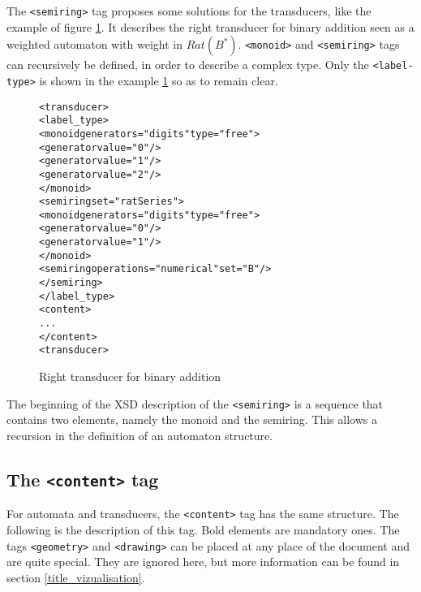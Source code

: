 \documentclass[a4paper]{article}
\def\typetag{\texttt{<label-type>}}
\def\contenttag{\texttt{<content>}}
\def\dstname{\texttt{dst}}
\def\srcname{\texttt{src}}
\def\geometrytag{\texttt{<geometry>}}
\def\drawingtag{\texttt{<drawing>}}
\def\monoidtag{\texttt{<monoid>}}
\def\semiringtag{\texttt{<semiring>}}
\begin{document}
The \semiringtag{} tag proposes some solutions for the transducers, like the
example of figure \ref{ratseries1}. It describes the right transducer
for binary addition seen as a weighted automaton with
weight in $Rat(B^*)$. \monoidtag{} and \semiringtag{} tags can recursively be
defined, in order to describe a complex type. Only the \typetag{} is shown in
the example \ref{ratseries1} so as to remain clear.

\begin{figure}[h]
  \begin{center}
\begin{alltt}
<transducer>
  <label_type>
    <monoid generators="digits" type="free">
      <generator value="0"/>
      <generator value="1"/>
      <generator value="2"/>
    </monoid>
    <semiring set="ratSeries">
      <monoid generators="digits" type="free">
        <generator value="0"/>
        <generator value="1"/>
      </monoid>
      <semiring operations="numerical" set="B"/>
    </semiring>
  </label_type>
  <content>
    ...
  </content>
<transducer>
\end{alltt}

\caption{Right transducer for binary addition}
\label{ratseries1}
  \end{center}
\end{figure}

The beginning of the XSD description of the \semiringtag{} is a sequence that
contains two elements, namely the monoid and the semiring. This allows a
recursion in the definition of an automaton structure.


\subsection{The \contenttag{} tag}

For automata and transducers, the \contenttag{} tag has the same structure.
The following is the description of this tag. Bold elements are mandatory ones.
The tags \geometrytag{} and \drawingtag{} can be placed at any
place of the document and are quite special. They are ignored here, but more
information can be found in section \ref{title_vizualisation}.\\\\
\end{document}
